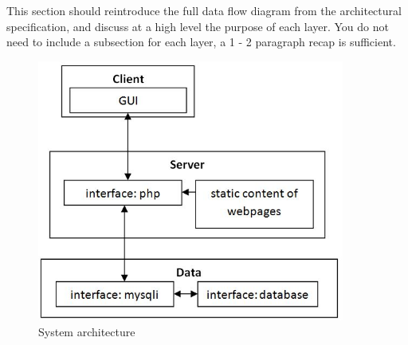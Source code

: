 This section should reintroduce the full data flow diagram from the architectural specification, and discuss at a high level the purpose of each layer. You do not need to include a subsection for each layer, a 1 - 2 paragraph recap is sufficient.

\begin{figure}[h!]
	\centering
 	\includegraphics[width=0.90\textwidth]{images/LayerBlockDiagramWithSubsystems}
 \caption{System architecture}
\end{figure}
